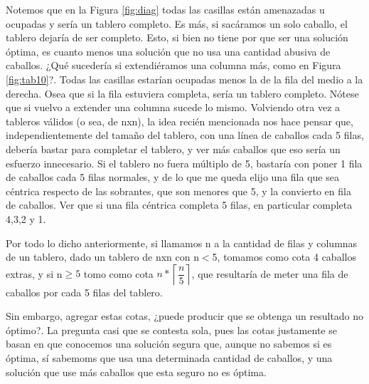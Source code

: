 
Notemos que en la Figura \ref{fig:diag} todas las casillas están amenazadas u ocupadas y sería un tablero completo. Es más, si sacáramos un solo caballo, el tablero dejaría de ser completo. Esto, si bien no tiene por que ser una solución óptima, es cuanto menos una solución que no usa una cantidad abusiva de caballos. ¿Qué sucedería si extendiéramos una columna más, como en Figura \ref{fig:tab10}?. Todas las casillas estarían ocupadas menos la de la fila del medio a la derecha. Osea que si la fila estuviera completa, sería un tablero completo. Nótese que si vuelvo a extender una columna sucede lo mismo. Volviendo otra vez a tableros válidos (o sea, de nxn), la idea recién mencionada nos hace pensar que, independientemente del tamaño del tablero, con una línea de caballos cada 5 filas, debería bastar para completar el tablero, y ver más caballos que eso sería un esfuerzo innecesario. Si el tablero no fuera múltiplo de 5, bastaría con poner 1 fila de caballos cada 5 filas normales, y de lo que me queda elijo una fila que sea céntrica respecto de las sobrantes, que son menores que 5, y la convierto en fila de caballos. Ver que si una fila céntrica completa 5 filas, en particular completa 4,3,2 y 1.

Por todo lo dicho anteriormente, si llamamos n a la cantidad de filas y columnas de un tablero, dado un tablero de nxn con n$<$5, tomamos como cota 4 caballos extras, y si n$\geq5$ tomo como cota $n*\left \lceil \dfrac{n}{5} \right \rceil$, que resultaría de meter una fila de caballos por cada 5 filas del tablero.

Sin embargo, agregar estas cotas, ¿puede producir que se obtenga un resultado no óptimo?. La pregunta casi que se contesta sola, pues las cotas justamente se basan en que conocemos una solución segura que, aunque no sabemos si es óptima, sí sabemoms que usa una determinada cantidad de caballos, y una solución que use más caballos que esta seguro no es óptima.

